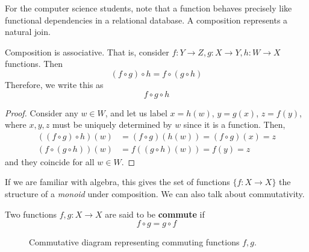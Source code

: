   For the computer science students, note that a function behaves precisely like functional dependencies in a relational database. A composition represents a natural join. 

  \begin{theorem}[Associativity]
    Composition is associative. That is, consider $f: Y \rightarrow Z, g: X \rightarrow Y, h: W \rightarrow X$ functions. Then 
    \begin{equation}
      (f \circ g) \circ h = f \circ (g \circ h)
    \end{equation} 
    Therefore, we write this as 
    \begin{equation}
      f \circ g \circ h
    \end{equation} 
    \begin{figure}[H]
      \centering 
      \caption{} 
      \label{fig:associative}
    \end{figure}
  \end{theorem}
  \begin{proof}
    Consider any $w \in W$, and let us label $x = h(w)$, $y = g(x)$, $z = f(y)$, where $x, y, z$ must be uniquely determined by $w$ since it is a function. Then, 
    \begin{align}
      ((f \circ g) \circ h) (w) & = (f \circ g) (h(w)) = (f \circ g) (x) = z  \\
      (f \circ (g \circ h)) (w) & = f ((g \circ h)(w)) = f (y) = z
    \end{align}
    and they coincide for all $w \in W$. 
  \end{proof} 

  If we are familiar with algebra, this gives the set of functions $\{f: X \rightarrow X\}$ the structure of a \textit{monoid} under composition. We can also talk about commutativity. 

  \begin{definition}[Commutativity]
    Two functions $f, g: X \rightarrow X$ are said to be \textbf{commute} if 
    \begin{equation}
      f \circ g = g \circ f
    \end{equation} 
    \begin{figure}[H]
      \centering 
      \caption{Commutative diagram representing commuting functions $f, g$. } 
      \label{fig:commutative}
    \end{figure}
  \end{definition}

